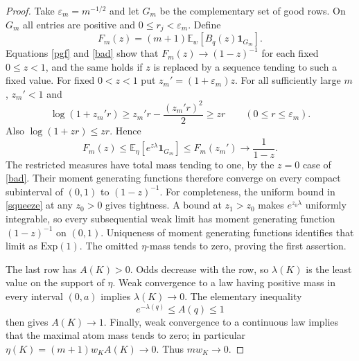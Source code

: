 \documentclass[11pt]{article}
\newcommand{\E}{\mathbb E}
\begin{document}
\begin{proof}
Take $\varepsilon_m=m^{-1/2}$ and let $G_m$ be the complementary
set of good rows. On $G_m$ all entries are positive and
$0\le r_j<\varepsilon_m$. Define
\[
 F_m(z)=(m+1)\E_w[B_q(z)\boldsymbol1_{G_m}].
\]
Equations \eqref{pgf} and \eqref{bad} show that
$F_m(z)\to(1-z)^{-1}$ for each fixed $0\le z<1$, and the same holds
if $z$ is replaced by a sequence tending to such a fixed value.
For fixed $0<z<1$ put $z_m'=(1+\varepsilon_m)z$. For all sufficiently
large $m$, $z_m'<1$ and
\[
 \log(1+z_m'r)\ge z_m'r-\frac{(z_m'r)^2}{2}\ge zr
 \qquad(0\le r\le\varepsilon_m).
\]
Also $\log(1+zr)\le zr$. Hence
\begin{equation}\label{squeeze}
 F_m(z)\le
 \E_\eta[e^{z\lambda}\boldsymbol1_{G_m}]
 \le F_m(z_m')\longrightarrow\frac1{1-z}.
\end{equation}
The restricted measures have total mass tending to one, by the
$z=0$ case of \eqref{bad}. Their moment generating functions therefore
converge on every compact subinterval of $(0,1)$ to $(1-z)^{-1}$.
For completeness, the uniform bound in \eqref{squeeze} at any
$z_0>0$ gives tightness. A bound at $z_1>z_0$ makes $e^{z_0\lambda}$
uniformly integrable, so every subsequential weak limit has moment
generating function $(1-z)^{-1}$ on $(0,1)$. Uniqueness of moment
generating functions identifies that limit as $\mathrm{Exp}(1)$.
The omitted $\eta$-mass tends to zero, proving the first assertion.

The last row has $A(K)>0$. Odds decrease with the row, so $\lambda(K)$
is the least value on the support of $\eta$. Weak convergence to a
law having positive mass in every interval $(0,a)$ implies
$\lambda(K)\to0$. The elementary inequality
\[
 e^{-\lambda(q)}\le A(q)\le1
\]
then gives $A(K)\to1$. Finally, weak convergence to a continuous law
implies that the maximal atom mass tends to zero; in particular
$\eta(K)=(m+1)w_KA(K)\to0$. Thus $m w_K\to0$.
\end{proof}
\end{document}
